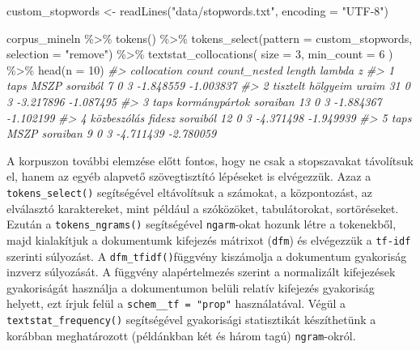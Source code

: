 \documentclass[
]{book}
\newenvironment{Shaded}{\begin{snugshade}}{\end{snugshade}}
\newcommand{\AttributeTok}[1]{\textcolor[rgb]{0.77,0.63,0.00}{#1}}
\newcommand{\CommentTok}[1]{\textcolor[rgb]{0.56,0.35,0.01}{\textit{#1}}}
\newcommand{\DecValTok}[1]{\textcolor[rgb]{0.00,0.00,0.81}{#1}}
\newcommand{\FunctionTok}[1]{\textcolor[rgb]{0.00,0.00,0.00}{#1}}
\newcommand{\NormalTok}[1]{#1}
\newcommand{\OtherTok}[1]{\textcolor[rgb]{0.56,0.35,0.01}{#1}}
\newcommand{\SpecialCharTok}[1]{\textcolor[rgb]{0.00,0.00,0.00}{#1}}
\newcommand{\StringTok}[1]{\textcolor[rgb]{0.31,0.60,0.02}{#1}}
\begin{document}
\begin{Shaded}
\begin{Highlighting}[]
\NormalTok{custom\_stopwords }\OtherTok{\textless{}{-}} \FunctionTok{readLines}\NormalTok{(}\StringTok{"data/stopwords.txt"}\NormalTok{, }\AttributeTok{encoding =} \StringTok{"UTF{-}8"}\NormalTok{)}

\NormalTok{corpus\_mineln }\SpecialCharTok{\%\textgreater{}\%}
  \FunctionTok{tokens}\NormalTok{() }\SpecialCharTok{\%\textgreater{}\%}
  \FunctionTok{tokens\_select}\NormalTok{(}\AttributeTok{pattern =}\NormalTok{ custom\_stopwords, }\AttributeTok{selection =} \StringTok{"remove"}\NormalTok{) }\SpecialCharTok{\%\textgreater{}\%}
  \FunctionTok{textstat\_collocations}\NormalTok{(}
    \AttributeTok{size =} \DecValTok{3}\NormalTok{,}
    \AttributeTok{min\_count =} \DecValTok{6}
\NormalTok{  ) }\SpecialCharTok{\%\textgreater{}\%}
  \FunctionTok{head}\NormalTok{(}\AttributeTok{n =} \DecValTok{10}\NormalTok{)}
\CommentTok{\#\textgreater{}                   collocation count count\_nested length    lambda         z}
\CommentTok{\#\textgreater{} 1          taps MSZP soraiból     7            0      3 {-}1.848559 {-}1.003837}
\CommentTok{\#\textgreater{} 2     tisztelt hölgyeim uraim    31            0      3 {-}3.217896 {-}1.087495}
\CommentTok{\#\textgreater{} 3 taps kormánypártok soraiban    13            0      3 {-}1.884367 {-}1.102199}
\CommentTok{\#\textgreater{} 4 közbeszólás fidesz soraiból    12            0      3 {-}4.371498 {-}1.949939}
\CommentTok{\#\textgreater{} 5          taps MSZP soraiban     9            0      3 {-}4.711439 {-}2.780059}
\end{Highlighting}
\end{Shaded}

A korpuszon további elemzése előtt fontos, hogy ne csak a stopszavakat
távolítsuk el, hanem az egyéb alapvető szövegtisztító lépéseket is
elvégezzük. Azaz a \texttt{tokens\_select()} segítségével eltávolítsuk a
számokat, a központozást, az elválasztó karaktereket, mint például a
szóközöket, tabulátorokat, sortöréseket. Ezután a
\texttt{tokens\_ngrams()} segítségével \texttt{ngarm}-okat hozunk létre
a tokenekből, majd kialakítjuk a dokumentumk kifejezés mátrixot
(\texttt{dfm}) és elvégezzük a \texttt{tf-idf} szerinti súlyozást. A
\texttt{dfm\_tfidf()}függvény kiszámolja a dokumentum gyakoriság inzverz
súlyozását. A függvény alapértelmezés szerint a normalizált kifejezések
gyakoriságát használja a dokumentumon belüli relatív kifejezés
gyakoriság helyett, ezt írjuk felül a \texttt{schem\_\_tf\ =\ "prop"}
használatával. Végül a \texttt{textstat\_frequency()} segítségével
gyakorisági statisztikát készíthetünk a korábban meghatározott
(példánkban két és három tagú) \texttt{ngram}-okról.
\end{document}
